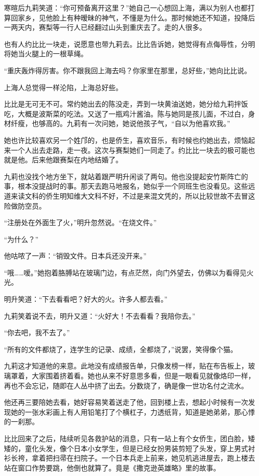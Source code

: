 \par 寒暄后九莉笑道：“你可预备离开这里？”她自己一心想回上海，满以为别人也都打算回家乡，见他脸上有种暧昧的神气，不懂是为什么。那时候她还不知道，投降后一两天内，赛梨等一行人已经翻过山头到重庆去了。走的人很多。
\par 也有人约比比一块走，说愿意也带九莉去。比比告诉她，她觉得有点侮辱性，分明将她当火腿上的一根草绳。
\par “重庆轰炸得厉害。你不跟我回上海去吗？你家里在那里，总好些，”她向比比说。
\par 上海人总觉得一样沦陷，上海总好些。
\par 比比是无可无不可。常约她出去的陈没走，弄到一块黄油送她，她分给九莉拌饭吃，大概是波斯菜的吃法。又送了一瓶鸡汁酱油。陈与她同是孩儿面，不过白，身材纤瘦，也够高的。九莉有一次问她，她说他孩子气，“自以为他喜欢我。”
\par 她也许比较喜欢另一个姓邝的，也是侨生，喜欢音乐，有时候也约她出去，烦恼起来一个人出去走路，走一夜。这次与赛梨她们一同走了。约比比一块去的极可能也就是他。后来他跟赛梨在内地结婚了。
\par 九莉也没找个地方坐下，就站着跟严明升闲谈了两句。他也没提起安竹斯阵亡的事，根本没提战时的事。那天去跑马地报名，她似乎一个同班生也没看见。这些远道来读文科的侨生明知维大文科不好，不过是来混文凭的，所以比较世故不去冒这险做防空员。
\par “注册处在外面生了火，”明升忽然说。“在烧文件。”
\par “为什么？”
\par 他咕哝了一声：“销毁文件。日本兵还没开来。”
\par “哦……嗳。”她抱着胳膊站在玻璃门边，有点茫然，向门外望去，仿佛以为看得见火光。
\par 明升笑道：“下去看看吧？好大的火。许多人都去看。”
\par 九莉笑着说不去，明升又道：“火好大！不去看看？我陪你去。”
\par “你去吧，我不去了。”
\par “所有的文件都烧了，连学生的记录、成绩，全都烧了，”说罢，笑得像个猫。
\par 九莉这才知道他的来意。此地没有成绩报告单，只像发榜一样，贴在布告板上，玻璃罩着，大家围着挤着看。她也从来不好意思多看，但是一眼看见就像烙印一样，再也不会忘记，随即在人丛中挤了出去。分数烧了，确是像一世功名付之流水。
\par 他还再三要陪她去看，她好容易笑着送走了他，回到楼上去，想起小时候有一次发现她的一张水彩画上有人用铅笔打了个横杠子，力透纸背，知道是她弟弟，那心悸的一刹那。
\par 比比回来了之后，陆续听见各救护站的消息，只有一站上有个女侨生，团白脸，矮矮的，童化头发，像个日本小女学生，但是已经女扮男装剪短了头发，穿上男式衬衫长袴，拿着把扫帚在扫院子。一个日本兵走上前来，她见机逃进屋去，跑上楼去站在窗口作势要跳，他倒也就算了。竟是《撒克逊英雄略》里的故事。

